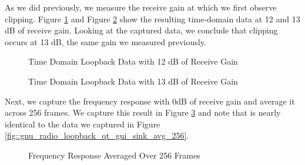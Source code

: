 \documentclass{article}
\begin{document}
As we did previously, we measure the receive gain at which we first observe clipping. Figure \ref{fig::gnu_radio_loopback_generic_iio_rx_gain_12dB} and Figure 
\ref{fig::gnu_radio_loopback_generic_iio_rx_gain_13dB} show the resulting time-domain data at 12 and 13 dB of receive gain. Looking at the captured data, we conclude that clipping occurs at 13 dB, the same gain we measured previously.
 
\begin{figure}[H]
	\centerline{}
	\caption{Time Domain Loopback Data with 12 dB of Receive Gain}
	\label{fig::gnu_radio_loopback_generic_iio_rx_gain_12dB}
\end{figure}

\begin{figure}[H]
	\centerline{}
	\caption{Time Domain Loopback Data with 13 dB of Receive Gain}
	\label{fig::gnu_radio_loopback_generic_iio_rx_gain_13dB}
\end{figure}

Next, we capture the frequency response with 0dB of receive gain and average it across 256 frames. We capture this result in Figure \ref{fig::gnu_radio_loopback_generic_iio_avg_256} and note that is nearly identical to the data we captured in Figure \ref{fig::gnu_radio_loopback_qt_gui_sink_avg_256}.

\begin{figure}[H]
	\centerline{}
	\caption{Frequency Response Averaged Over 256 Frames}
	\label{fig::gnu_radio_loopback_generic_iio_avg_256}
\end{figure}
\end{document}
